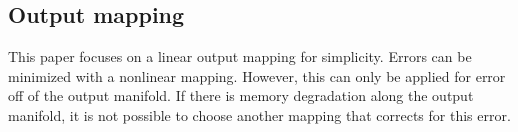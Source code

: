 \documentclass{article} %
\newcounter{ct}
\theoremstyle{definition}
\theoremstyle{remark}
\begin{document}


\subsection{Output mapping} %
This paper focuses on a linear output mapping for simplicity.
Errors can be minimized with a nonlinear mapping.
However, this can only be applied for error off of the output manifold.
If there is memory degradation along the output manifold, it is not possible to choose another mapping that corrects for this error.
\end{document}
